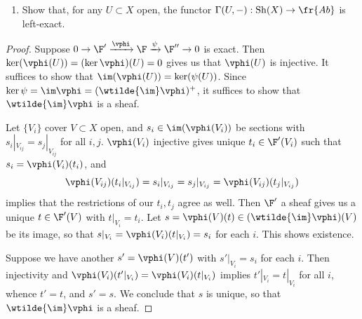\documentclass[12pt]{amsart}
\newcommand{\G}{\mathscr{G}}
\DeclareMathOperator{\Sh}{Sh}
\newcommand{\Ab}{\fr{Ab}}
\begin{document}
% 

\begin{enumerate}
	\item[8.] {
      Show that, for any $U\subset X$ open, the functor $\Gamma(U,-):\Sh(X)\to \Ab$ is left-exact.
    }
\end{enumerate}

\begin{proof}
  Suppose $0\to \F'\xrightarrow{\vphi}\F\xrightarrow{\psi}\F''\to 0$ is exact.
  Then $\ker(\vphi(U)) = (\ker\vphi)(U)=0$ gives us that $\vphi(U)$ is injective. 
  It suffices to show that $\im(\vphi(U))=\ker(\psi(U))$.
  Since $\ker\psi =\im\vphi = (\wtilde{\im}\vphi)^+$, it suffices to show that $\wtilde{\im}\vphi$ is a sheaf.

  Let $\{V_i\}$ cover $V\subset X$ open, and $s_i\in \im(\vphi(V_i))$ be sections with $s_i|_{V_{ij}}=s_j|_{V_{ij}}$ for all $i,j$.
  $\vphi(V_i)$ injective gives unique $t_i\in \F'(V_i)$ such that $s_i=\vphi(V_i)(t_i)$, and
  \[
    \vphi(V_{ij})(t_i|_{V_{ij}}) = s_i|_{V_{ij}}=s_j|_{V_{ij}} = \vphi(V_{ij})(t_j|_{V_{ij}})
  \] 
  implies that the restrictions of our $t_i,t_j$ agree as well.
  Then $\F'$ a sheaf gives us a unique $t\in \F'(V)$ with $t|_{V_i}=t_i$.
  Let $s=\vphi(V)(t)\in(\wtilde{\im}\vphi)(V)$ be its image, so that $s|_{V_i} = \vphi(V_i)(t|_{V_i}) = s_i$ for each $i$.
  This shows existence.

  Suppose we have another $s'=\vphi(V)(t')$ with $s'|_{V_i}=s_i$ for each $i$. 
  Then injectivity and $\vphi(V_i)(t'|_{V_i})= \vphi(V_i)(t|_{V_i})$ implies $t'|_{V_i}=t|_{V_i}$ for all $i$, whence $t'=t$, and $s'=s$.
  We conclude that $s$ is unique, so that $\wtilde{\im}\vphi$ is a sheaf.
\end{proof}
\end{document}
